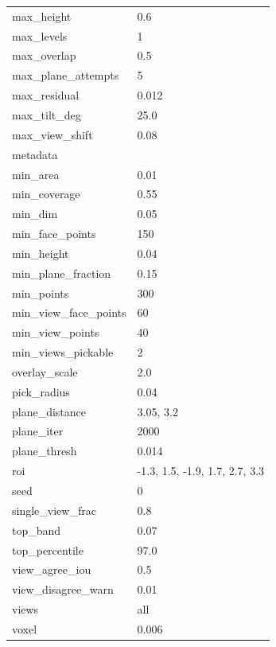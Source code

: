 \begin{table}[H]
\begin{tabularx}{\textwidth}{@{}Xl@{}}
    max\_height & 0.6 \\
    max\_levels & 1 \\
    max\_overlap & 0.5 \\
    max\_plane\_attempts & 5 \\
    max\_residual & 0.012 \\
    max\_tilt\_deg & 25.0 \\
    max\_view\_shift & 0.08 \\
    metadata & {} \\
    min\_area & 0.01 \\
    min\_coverage & 0.55 \\
    min\_dim & 0.05 \\
    min\_face\_points & 150 \\
    min\_height & 0.04 \\
    min\_plane\_fraction & 0.15 \\
    min\_points & 300 \\
    min\_view\_face\_points & 60 \\
    min\_view\_points & 40 \\
    min\_views\_pickable & 2 \\
    overlay\_scale & 2.0 \\
    pick\_radius & 0.04 \\
    plane\_distance & 3.05, 3.2 \\
    plane\_iter & 2000 \\
    plane\_thresh & 0.014 \\
    roi & -1.3, 1.5, -1.9, 1.7, 2.7, 3.3 \\
    seed & 0 \\
    single\_view\_frac & 0.8 \\
    top\_band & 0.07 \\
    top\_percentile & 97.0 \\
    view\_agree\_iou & 0.5 \\
    view\_disagree\_warn & 0.01 \\
    views & all \\
    voxel & 0.006 \\
    \bottomrule
  \end{tabularx}
\end{table}




